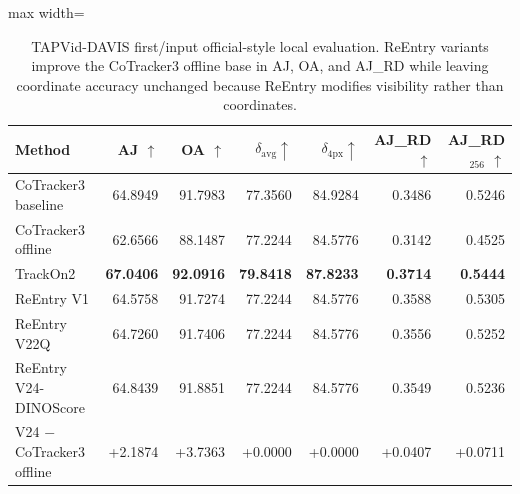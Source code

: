 \begin{table}[t]
\centering
\caption{TAPVid-DAVIS first/input official-style local evaluation. ReEntry variants improve the CoTracker3 offline base in AJ, OA, and AJ\_RD while leaving coordinate accuracy unchanged because ReEntry modifies visibility rather than coordinates.}
\label{tab:davis_first_input}
\small
\begin{adjustbox}{max width=\textwidth}
\begin{tabular}{lrrrrrr}
\toprule
Method & AJ $\uparrow$ & OA $\uparrow$ & $\delta_{\mathrm{avg}} \uparrow$ & $\delta_{4\mathrm{px}} \uparrow$ & AJ\_RD $\uparrow$ & AJ\_RD$_{256}$ $\uparrow$ \\
\midrule
CoTracker3 baseline & 64.8949 & 91.7983 & 77.3560 & 84.9284 & 0.3486 & 0.5246 \\
CoTracker3 offline & 62.6566 & 88.1487 & 77.2244 & 84.5776 & 0.3142 & 0.4525 \\
TrackOn2 & \textbf{67.0406} & \textbf{92.0916} & \textbf{79.8418} & \textbf{87.8233} & \textbf{0.3714} & \textbf{0.5444} \\
ReEntry V1 & 64.5758 & 91.7274 & 77.2244 & 84.5776 & 0.3588 & 0.5305 \\
ReEntry V22Q & 64.7260 & 91.7406 & 77.2244 & 84.5776 & 0.3556 & 0.5252 \\
ReEntry V24-DINOScore & 64.8439 & 91.8851 & 77.2244 & 84.5776 & 0.3549 & 0.5236 \\
\midrule
V24 $-$ CoTracker3 offline & +2.1874 & +3.7363 & +0.0000 & +0.0000 & +0.0407 & +0.0711 \\
\bottomrule
\end{tabular}
\end{adjustbox}
\end{table}

